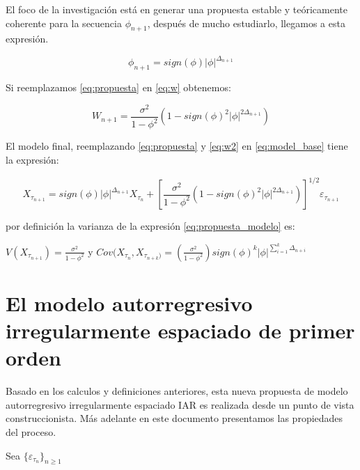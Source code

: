 El foco de la investigación está en generar una propuesta estable y teóricamente coherente para la secuencia $\phi_{n+1}$, después de mucho estudiarlo, llegamos a esta expresión.

\begin{equation}
\phi_{n+1} = sign(\phi)|\phi|^{\Delta_{n+1}}
\label{eq:propuesta}
\end{equation}

Si reemplazamos \ref{eq:propuesta} en \ref{eq:w} obtenemos:

\begin{equation}
W_{n+1} = \frac{\sigma^2}{1-\phi^2} \left(1-sign(\phi)^2 |\phi|^{2\Delta_{n+1}}\right)
\label{eq:w2}
\end{equation}

El modelo final, reemplazando \ref{eq:propuesta} y \ref{eq:w2} en \ref{eq:model_base} tiene la expresión:

\begin{equation}
X_{\tau_{n+1}} = sign(\phi)|\phi|^{\Delta_{n+1}} X_{\tau_n} + \left[\frac{\sigma^2}{1-\phi^2} \left(1-sign(\phi)^2 |\phi|^{2\Delta_{n+1}}\right)\right]^{1/2} \varepsilon_{\tau_{n+1}}
\label{eq:propuesta_modelo}
\end{equation}
 
por definición la varianza de la expresión \ref{eq:propuesta_modelo} es:

 $V(X_{\tau_{n+1}}) =  \frac{\sigma^2}{1-\phi^2}$ y $Cov(X_{\tau_n}, X_{\tau_{n+k})} = \left(\frac{\sigma^2}{1-\phi^2}\right)sign(\phi)^k|\phi|^{\sum_{i=1}^{k}\Delta_{n+i}}$

\section{El modelo autorregresivo irregularmente espaciado de primer orden}

Basado en los calculos y definiciones anteriores, esta nueva propuesta de modelo autorregresivo 
irregularmente espaciado IAR es realizada desde un punto de vista construccionista. Más adelante en este documento
presentamos las propiedades del proceso.

\begin{definition} Sea $\lbrace \varepsilon_{\tau_n} \rbrace_{n \geq 1}$
\end{definition}

